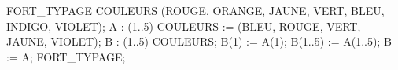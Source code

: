 \begin{programs}[0.5cm]
\PROCEDURE FORT\_TYPAGE \IS
  \TYPE COULEURS \IS
           (ROUGE, ORANGE, JAUNE, VERT, BLEU, INDIGO, VIOLET);
  A : \ARRAY (1..5) \OF COULEURS
                        := (BLEU, ROUGE, VERT, JAUNE, VIOLET);
  B : \ARRAY (1..5) \OF COULEURS;
\BEGIN
  B(1) := A(1); \label{progFORTTYPAGEinstruction1}
  B(1..5) := A(1..5); \label{progFORTTYPAGEinstruction2}
  B := A; \label{progFORTTYPAGEinstruction3}
\END FORT\_TYPAGE;
\end{programs}